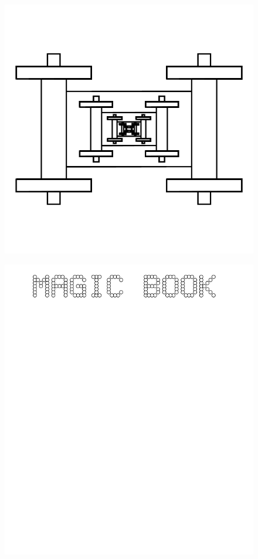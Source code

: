 \documentclass[17pt]{extreport}
\begin{document}
	\begin{figure}
		\centering
		\includegraphics[width=6.25in]{imageserver/uploadimages/image17.png}
	\end{figure}
	\begin{figure}
		\centering
		\includegraphics[width=6.25in]{imageserver/uploadimages/magicbook.png}
	\end{figure}
\end{document}
